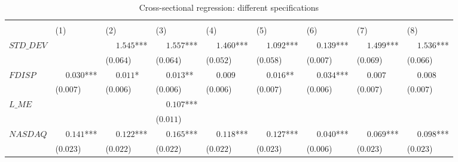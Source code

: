 \begin{table}

\caption[Regression: Different Specifications]{\label{tab:reg_compact_main_old}Cross-sectional regression: different specifications}
\centering
\fontsize{9}{11}\selectfont
\begin{threeparttable}
\begin{tabular}[t]{>{\raggedright\arraybackslash}p{2.6cm}>{\raggedright\arraybackslash}p{1.3cm}>{\raggedright\arraybackslash}p{1.3cm}>{\raggedright\arraybackslash}p{1.3cm}>{\raggedright\arraybackslash}p{1.3cm}>{\raggedright\arraybackslash}p{1.3cm}>{\raggedright\arraybackslash}p{1.3cm}>{\raggedright\arraybackslash}p{1.3cm}l}
\toprule
\multicolumn{1}{c}{ } & \multicolumn{4}{c}{$L\_TURN$} & \multicolumn{1}{c}{Ranks} & \multicolumn{1}{c}{$L\_TURN_\_1d$} & \multicolumn{1}{c}{$L\_TURN_\_1w$} \\
\cmidrule(l{3pt}r{3pt}){2-5} \cmidrule(l{3pt}r{3pt}){6-6} \cmidrule(l{3pt}r{3pt}){7-7} \cmidrule(l{3pt}r{3pt}){8-8}
 & \phantom{-}(1) & \phantom{-}(2) & \phantom{-}(3) & \phantom{-}(4) & \phantom{-}(5) & \phantom{-}(6) & \phantom{-}(7) & \phantom{-}(8)\\
\midrule
$STD\_DEV$ &  & $\phantom{-}1.545$*** & $\phantom{-}1.557$*** & $\phantom{-}1.460$*** & $\phantom{-}1.092$*** & $\phantom{-}0.139$*** & $\phantom{-}1.499$*** & $\phantom{-}1.536$***\\
 &  & (\phantom{-}$0.064$) & (\phantom{-}$0.064$) & (\phantom{-}$0.052$) & (\phantom{-}$0.058$) & (\phantom{-}$0.007$) & (\phantom{-}$0.069$) & (\phantom{-}$0.066$)\\
\addlinespace
$FDISP$ & $\phantom{-}0.030$*** & $\phantom{-}0.011$* & $\phantom{-}0.013$** & $\phantom{-}0.009$ & $\phantom{-}0.016$** & $\phantom{-}0.034$*** & $\phantom{-}0.007$ & $\phantom{-}0.008$\\
 & (\phantom{-}$0.007$) & (\phantom{-}$0.006$) & (\phantom{-}$0.006$) & (\phantom{-}$0.006$) & (\phantom{-}$0.007$) & (\phantom{-}$0.006$) & (\phantom{-}$0.007$) & (\phantom{-}$0.007$)\\
\addlinespace
$L\_ME$ &  &  & $\phantom{-}0.107$*** &  &  &  &  & \\
 &  &  & (\phantom{-}$0.011$) &  &  &  &  & \\
\addlinespace
$NASDAQ$ & $\phantom{-}0.141$*** & $\phantom{-}0.122$*** & $\phantom{-}0.165$*** & $\phantom{-}0.118$*** & $\phantom{-}0.127$*** & $\phantom{-}0.040$*** & $\phantom{-}0.069$*** & $\phantom{-}0.098$***\\
 & (\phantom{-}$0.023$) & (\phantom{-}$0.022$) & (\phantom{-}$0.022$) & (\phantom{-}$0.022$) & (\phantom{-}$0.023$) & (\phantom{-}$0.006$) & (\phantom{-}$0.023$) & (\phantom{-}$0.023$)\\

\end{tabular}
\end{threeparttable}
\end{table}
